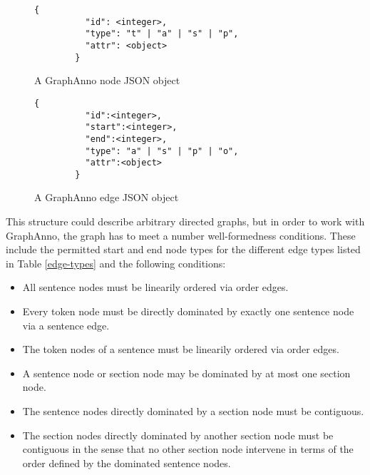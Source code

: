 \documentclass[12pt]{scrartcl}
\newenvironment{figurel}{\begin{figure}[htb]}{\end{figure}}
\begin{document}
\begin{figurel}
	\begin{lstlisting}[gobble=8]
		{
		  "id": <integer>,
		  "type": "t" | "a" | "s" | "p",
		  "attr": <object>
		}
	\end{lstlisting}
	\caption{A GraphAnno node JSON object}
	\label{json-node}
\end{figurel}
\begin{figurel}
	\begin{lstlisting}[gobble=8]
		{
		  "id":<integer>,
		  "start":<integer>,
		  "end":<integer>,
		  "type": "a" | "s" | "p" | "o",
		  "attr":<object>
		}
	\end{lstlisting}
	\caption{A GraphAnno edge JSON object}
	\label{json-edge}
\end{figurel}

This structure could describe arbitrary directed graphs, but in order to work with GraphAnno, the graph has to meet a number well-formedness conditions. These include the permitted start and end node types for the different edge types listed in Table \ref{edge-types} and the following conditions:

\begin{itemize}
	\item All sentence nodes must be linearily ordered via order edges.
	\item Every token node must be directly dominated by exactly one sentence node via a sentence edge.
	\item The token nodes of a sentence must be linearily ordered via order edges.
	\item A sentence node or section node may be dominated by at most one section node.
	\item The sentence nodes directly dominated by a section node must be contiguous.
	\item The section nodes directly dominated by another section node must be contiguous in the sense that no other section node intervene in terms of the order defined by the dominated sentence nodes.
\end{itemize}
\end{document}
